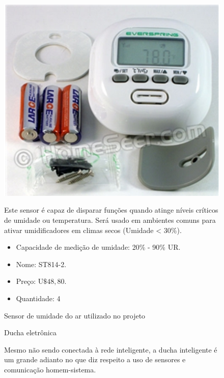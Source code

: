 \begin{enumerate}
\begin{figure}[h]
	  \begin{center}
		\includegraphics[keepaspectratio,scale=0.60]{figuras/sensor_umidade.eps}
		\caption{Sensor de umidade do ar utilizado no projeto}
	  \end{center}

	Este sensor é capaz de disparar funções quando atinge níveis críticos de umidade ou temperatura. Será usado em ambientes comuns para ativar umidificadores em climas secos (Umidade < 30\%). 

	\begin{itemize}
		\item Capacidade de medição de umidade: 20\% - 90\% UR.
		\item Nome: ST814-2.
		\item Preço: U$\$ 48,80$.
		\item Quantidade: 4
	\end{itemize}

	\end{figure}

	\begin{figure}[h]
	\item Ducha eletrônica
	
	Mesmo não sendo conectada à rede inteligente, a ducha inteligente é um grande adianto no que diz respeito a uso de sensores e comunicação homem-sistema.
	

\end{figure}
\end{enumerate}
